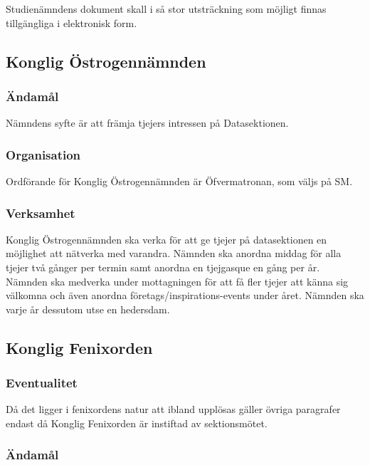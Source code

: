 \documentclass{dgovdoc}
\begin{document}
Studienämndens dokument skall i så stor utsträckning som möjligt finnas
tillgängliga i elektronisk form.

\subsection{Konglig Östrogennämnden}

\subsubsection{Ändamål}

Nämndens syfte är att främja tjejers intressen på Datasektionen.

\subsubsection{Organisation}

Ordförande för Konglig Östrogennämnden är Öfvermatronan, som väljs på SM.

\subsubsection{Verksamhet}

Konglig Östrogennämnden ska verka för att ge tjejer på datasektionen en
möjlighet att nätverka med varandra. Nämnden ska anordna middag för alla tjejer
två gånger per termin samt anordna en tjejgasque en gång per år. Nämnden ska
medverka under mottagningen för att få fler tjejer att känna sig välkomna och
även anordna företags/inspirations-events under året. Nämnden ska varje år
dessutom utse en hedersdam.

\subsection{Konglig Fenixorden}

\subsubsection{Eventualitet}

Då det ligger i fenixordens natur att ibland upplösas gäller övriga paragrafer
endast då Konglig Fenixorden är instiftad av sektionsmötet.

\subsubsection{Ändamål}
\end{document}
